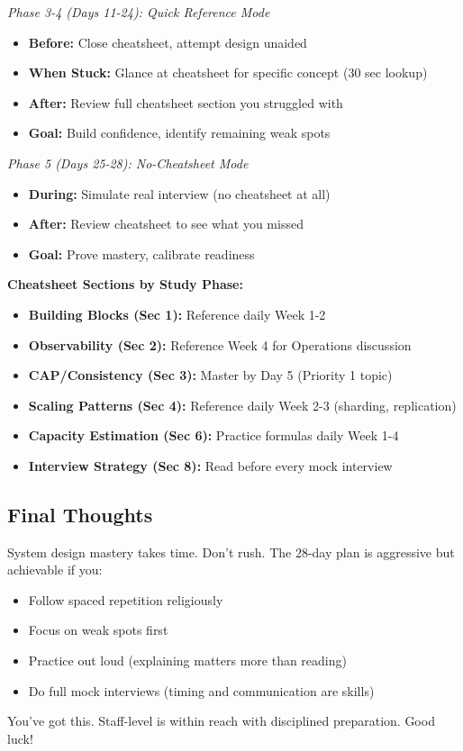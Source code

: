\documentclass[10pt]{article}
\begin{document}
\textit{Phase 3-4 (Days 11-24): Quick Reference Mode}
\begin{itemize}
\item \textbf{Before:} Close cheatsheet, attempt design unaided
\item \textbf{When Stuck:} Glance at cheatsheet for specific concept (30 sec lookup)
\item \textbf{After:} Review full cheatsheet section you struggled with
\item \textbf{Goal:} Build confidence, identify remaining weak spots
\end{itemize}

\textit{Phase 5 (Days 25-28): No-Cheatsheet Mode}
\begin{itemize}
\item \textbf{During:} Simulate real interview (no cheatsheet at all)
\item \textbf{After:} Review cheatsheet to see what you missed
\item \textbf{Goal:} Prove mastery, calibrate readiness
\end{itemize}

\textbf{Cheatsheet Sections by Study Phase:}
\begin{itemize}
\item \textbf{Building Blocks (Sec 1):} Reference daily Week 1-2
\item \textbf{Observability (Sec 2):} Reference Week 4 for Operations discussion
\item \textbf{CAP/Consistency (Sec 3):} Master by Day 5 (Priority 1 topic)
\item \textbf{Scaling Patterns (Sec 4):} Reference daily Week 2-3 (sharding, replication)
\item \textbf{Capacity Estimation (Sec 6):} Practice formulas daily Week 1-4
\item \textbf{Interview Strategy (Sec 8):} Read before every mock interview
\end{itemize}

\subsection{Final Thoughts}

System design mastery takes time. Don't rush. The 28-day plan is aggressive but achievable if you:
\begin{itemize}
\item Follow spaced repetition religiously
\item Focus on weak spots first
\item Practice out loud (explaining matters more than reading)
\item Do full mock interviews (timing and communication are skills)
\end{itemize}

You've got this. Staff-level is within reach with disciplined preparation. Good luck!
\end{document}
